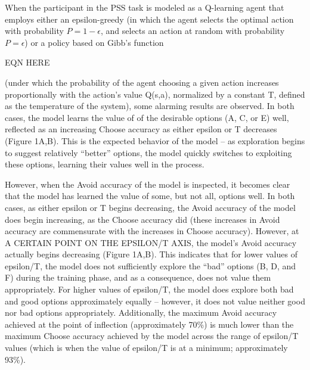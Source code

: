 \documentclass[10pt,letterpaper]{article}
\begin{document}

When the participant in the PSS task is modeled as a Q-learning agent that employs either an epsilon-greedy (in which the agent selects the optimal action with probability $P = 1 - \epsilon$, and selects an action at random with probability $P = \epsilon$) or a policy based on Gibb’s function 

	EQN HERE
	
(under which the probability of the agent choosing a given action increases proportionally with the action’s value Q(s,a), normalized by a constant T, defined as the temperature of the system), some alarming results are observed. In both cases, the model learns the value of of the desirable options (A, C, or E) well, reflected as an increasing Choose accuracy as either epsilon or T decreases (Figure 1A,B). This is the expected behavior of the model – as exploration begins to suggest relatively “better” options, the model quickly switches to exploiting these options, learning their values well in the process.

However, when the Avoid accuracy of the model is inspected, it becomes clear that the model has learned the value of some, but not all, options well. In both cases, as either epsilon or T begins decreasing, the Avoid accuracy of the model does begin increasing, as the Choose accuracy did (these increases in Avoid accuracy are commensurate with the increases in Choose accuracy). However, at A CERTAIN POINT ON THE EPSILON/T AXIS, the model’s Avoid accuracy actually begins decreasing (Figure 1A,B). This indicates that for lower values of epsilon/T, the model does not sufficiently explore the “bad” options (B, D, and F) during the training phase, and as a consequence, does not value them appropriately. For higher values of epsilon/T, the model does explore both bad and good options approximately equally – however, it does not value neither good nor bad options appropriately. Additionally, the maximum Avoid accuracy achieved at the point of inflection (approximately 70\%) is much lower than the maximum Choose accuracy achieved by the model across the range of epsilon/T values (which is when the value of epsilon/T is at a minimum; approximately 93\%). 
\end{document}
